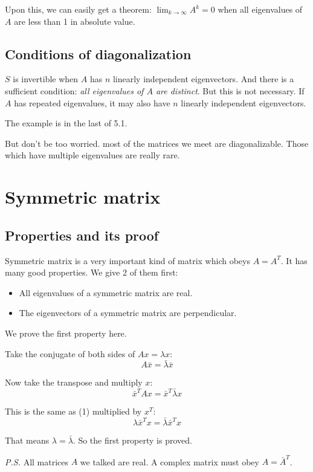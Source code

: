 \documentclass[10pt,a4paper,oneside,numbers=noenddot]{scrbook}
\theoremstyle{ctplain}
\theoremstyle{ctresult}
\begin{document}
Upon this, we can easily get a theorem: $\lim_{k \to \infty} A^k = 0$ when all
eigenvalues of $A$ are less than 1 in absolute value.

\subsection{Conditions of diagonalization}

$S$ is invertible when $A$ has $n$ linearly independent eigenvectors. And there is a
sufficient condition: \emph{all eigenvalues of $A$ are distinct}. But this is not necessary.
If $A$ has repeated eigenvalues, it may also have $n$ linearly independent eigenvectors.

The example is in the last of 5.1.

But don't be too worried. most of the matrices we meet are diagonalizable. Those which
have multiple eigenvalues are really rare.

\section{Symmetric matrix}
\subsection{Properties and its proof}

Symmetric matrix is a very important kind of matrix which obeys $A = A^{T}$. It has many
good properties. We give 2 of them first:
\begin{itemize}
  \item All eigenvalues of a symmetric matrix are real.
  \item The eigenvectors of a symmetric matrix are perpendicular.
\end{itemize}

We prove the first property here.

Take the conjugate of both sides of $Ax = \lambda x$:
\[
  A\bar{x} = \bar{\lambda}\bar{x} \tag{1}
\]

Now take the transpose and multiply $x$:
\[
  \bar{x}^{T}Ax = \bar{x}^{T}\bar{\lambda}x \tag{2}
\]

This is the same as (1) multiplied by $x^{T}$:
\[
  \lambda \bar{x}^{T}x = \bar{\lambda} \bar{x}^{T}x \tag{3}
\]

That means $\lambda = \bar{\lambda}$. So the first property is proved.

\emph{P.S.} All matrices $A$ we talked are real. A complex matrix must obey $A =
\bar{A}^{T}$.
\end{document}
